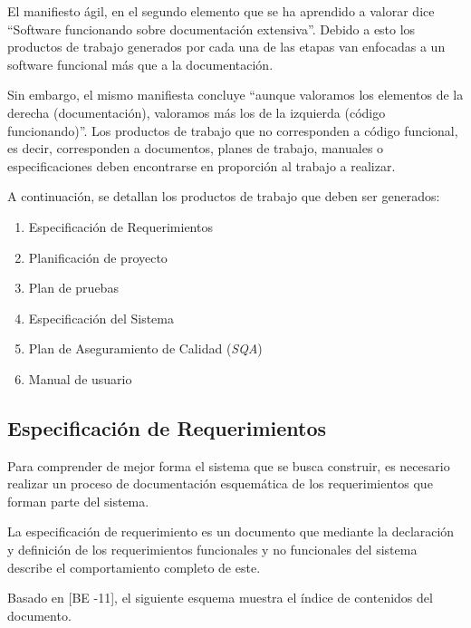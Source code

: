 El manifiesto ágil, en el segundo elemento que se ha aprendido a valorar dice “Software funcionando sobre documentación extensiva”. Debido a esto los productos de trabajo generados por cada una de las etapas van enfocadas a un software funcional más que a la documentación.

Sin embargo, el mismo manifiesta concluye “aunque valoramos los elementos de la derecha (documentación), valoramos más los de la izquierda (código funcionando)”. Los productos de trabajo que no corresponden a código funcional, es decir, corresponden a documentos, planes de trabajo, manuales o especificaciones deben encontrarse en proporción al trabajo a realizar.

A continuación, se detallan los productos de trabajo que deben ser generados:

\begin{enumerate}
	\item Especificación de Requerimientos
	\item Planificación de proyecto
	\item Plan de pruebas
	\item Especificación del Sistema
	\item Plan de Aseguramiento de Calidad (\emph{SQA})
	\item Manual de usuario
\end{enumerate}

\subsection{Especificación de Requerimientos}

Para comprender de mejor forma el sistema que se busca construir, es necesario realizar un proceso de documentación esquemática de los requerimientos que forman parte del sistema.

La especificación de requerimiento es un documento que mediante la declaración y definición de los requerimientos funcionales y no funcionales del sistema describe el comportamiento completo de este.

Basado en [BE -11], el siguiente esquema muestra el índice de contenidos del documento. 

